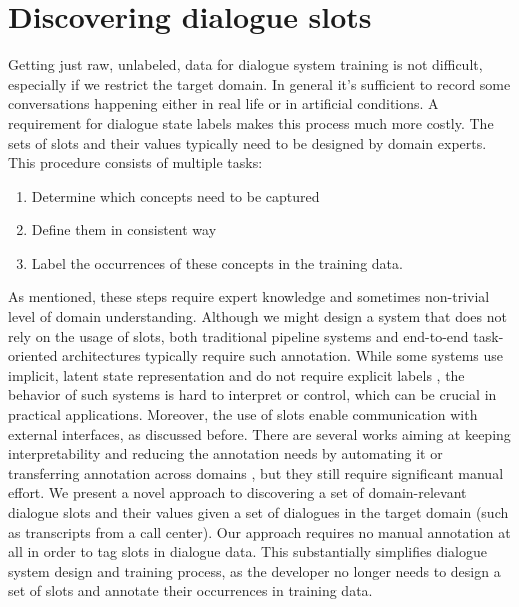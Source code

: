 \section{Discovering dialogue slots}
Getting just raw, unlabeled, data for dialogue system training is not difficult, especially if we restrict the target domain.
In general it's sufficient to record some conversations happening either in real life or in artificial conditions. 
A requirement for dialogue state labels makes this process much more costly.
The sets of slots and their values typically need to be designed by domain experts.
This procedure consists of multiple tasks:
\begin{enumerate}
    \item Determine which concepts need to be captured
    \item Define them in consistent way
    \item Label the occurrences of these concepts in the training data.
\end{enumerate}
As mentioned, these steps require expert knowledge and sometimes non-trivial level of domain understanding.
Although we might design a system that does not rely on the usage of slots, both traditional pipeline systems \cite{young_pomdp-based_2013} and end-to-end task-oriented architectures \cite{wen2016network} typically require such annotation.
While some systems use implicit, latent state representation and do not require explicit labels \citep{serban2016building}, the behavior of such systems is hard to interpret or control, which can be crucial in practical applications.
Moreover, the use of slots enable communication with external interfaces, as discussed before.
There are several works aiming at keeping interpretability and reducing the annotation needs by automating it \citep{chen2014leveraging,chen2015jointly} or transferring annotation across domains \cite{zhao_zero-shot_2018,coope_span-convert_2020}, but they still require significant manual effort.
We present a novel approach to discovering a set of domain-relevant dialogue slots and their values given a set of dialogues in the target domain (such as transcripts from a call center).
Our approach requires no manual annotation at all in order to tag slots in dialogue data.
This substantially simplifies dialogue system design and training process, as the developer no longer needs to design a set of slots and annotate their occurrences in training data.
